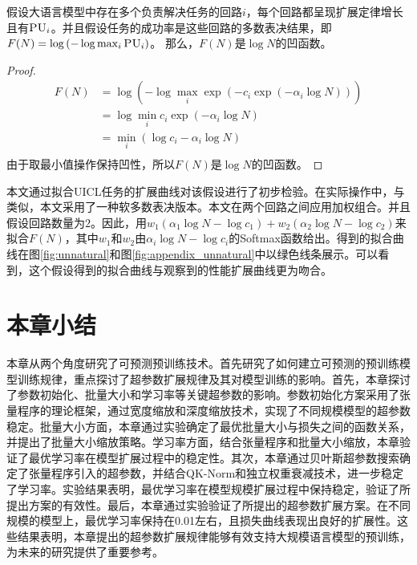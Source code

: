 \begin{theorem}
假设大语言模型中存在多个负责解决任务的回路\(i\)，每个回路都呈现扩展定律增长且有\(\textsc{PU}_i\)。{并且假设}任务的成功率是这些回路的多数表决结果，即\(F(N)  = \operatorname{log}\left(-\operatorname{log}\max_i \textsc{PU}_i\right)\)。
那么，\(F(N)\)是\(\operatorname{log}N\)的凹函数。
\end{theorem}

\begin{proof}
    \begin{equation}
    \label{eq:app_th_2}
    \begin{split}
    F(N) &= \operatorname{log}\left(-\operatorname{log}\max_i \operatorname{exp}\left(- c_i \operatorname{exp}(-\alpha_i \operatorname{log} N)\right)\right) \\
        &= \operatorname{log} \min_i  c_i \operatorname{exp}(-\alpha_i \operatorname{log} N) \\
    &=  \min_i (\operatorname{log} c_i-\alpha_i \operatorname{log} N) \\
    \end{split}
    \end{equation}
    由于取最小值操作保持凹性，所以\(F(N)\)是\(\operatorname{log}N\)的凹函数。 
\end{proof}


本文通过拟合UICL任务的扩展曲线对该假设进行了初步检验。在实际操作中，与\citet{varma2023explaining}类似，本文采用了一种软多数表决版本。本文在两个回路之间应用加权组合。并且假设回路数量为\(2\)。因此，用\({w_1}({\alpha_1}\log N-\log{c_1}) + {w_2}({\alpha_2}\log N - \log c_2)\)来拟合\(F(N)\)，其中\(w_1\)和\(w_2\)由\({\alpha_i}\log N -\log {c_i}\)的Softmax函数给出。得到的拟合曲线在图\ref{fig:unnatural}和图\ref{fig:appendix_unnatural}中以{\color[rgb]{0.3, 0.6, 0.45}绿色}线条展示。可以看到，这个假设得到的拟合曲线与观察到的性能扩展曲线更为吻合。 



\section{本章小结}
本章从两个角度研究了可预测预训练技术。首先研究了如何建立可预测的预训练模型训练规律，重点探讨了超参数扩展规律及其对模型训练的影响。首先，本章探讨了参数初始化、批量大小和学习率等关键超参数的影响。参数初始化方案采用了张量程序的理论框架，通过宽度缩放和深度缩放技术，实现了不同规模模型的超参数稳定。批量大小方面，本章通过实验确定了最优批量大小与损失之间的函数关系，并提出了批量大小缩放策略。学习率方面，结合张量程序和批量大小缩放，本章验证了最优学习率在模型扩展过程中的稳定性。其次，本章通过贝叶斯超参数搜索确定了张量程序引入的超参数，并结合QK-Norm和独立权重衰减技术，进一步稳定了学习率。实验结果表明，最优学习率在模型规模扩展过程中保持稳定，验证了所提出方案的有效性。最后，本章通过实验验证了所提出的超参数扩展方案。在不同规模的模型上，最优学习率保持在0.01左右，且损失曲线表现出良好的扩展性。这些结果表明，本章提出的超参数扩展规律能够有效支持大规模语言模型的预训练，为未来的研究提供了重要参考。

